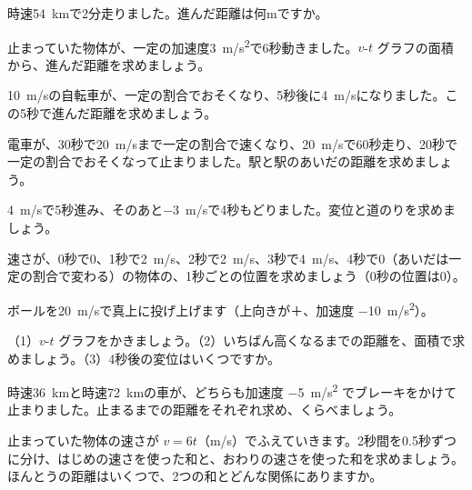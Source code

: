 \bkendproblems
{}

\bkproblem 時速\qty{54}{km}で2分走りました。進んだ距離は何mですか。

\bkproblem 止まっていた物体が、一定の加速度\qty{3}{m/s^2}で6秒動きました。$v$-$t$ グラフの面積から、進んだ距離を求めましょう。

\bkproblem \qty{10}{m/s}の自転車が、一定の割合でおそくなり、5秒後に\qty{4}{m/s}になりました。この5秒で進んだ距離を求めましょう。

\bkproblem 電車が、30秒で\qty{20}{m/s}まで一定の割合で速くなり、\qty{20}{m/s}で60秒走り、20秒で一定の割合でおそくなって止まりました。駅と駅のあいだの距離を求めましょう。

\bkproblem \qty{4}{m/s}で5秒進み、そのあと\qty{-3}{m/s}で4秒もどりました。変位と道のりを求めましょう。

\bkproblem 速さが、0秒で0、1秒で\qty{2}{m/s}、2秒で\qty{2}{m/s}、3秒で\qty{4}{m/s}、4秒で0（あいだは一定の割合で変わる）の物体の、1秒ごとの位置を求めましょう（0秒の位置は0）。


\bkproblem ボールを\qty{20}{m/s}で真上に投げ上げます（上向きが＋、加速度 \qty{-10}{m/s^2}）。\par
（1）$v$-$t$ グラフをかきましょう。\quad（2）いちばん高くなるまでの距離を、面積で求めましょう。\quad（3）4秒後の変位はいくつですか。

\bkproblem 時速\qty{36}{km}と時速\qty{72}{km}の車が、どちらも加速度 \qty{-5}{m/s^2} でブレーキをかけて止まりました。止まるまでの距離をそれぞれ求め、くらべましょう。

\bkproblem 止まっていた物体の速さが $v=6t$（m/s）でふえていきます。2秒間を0.5秒ずつに分け、はじめの速さを使った和と、おわりの速さを使った和を求めましょう。ほんとうの距離はいくつで、2つの和とどんな関係にありますか。

